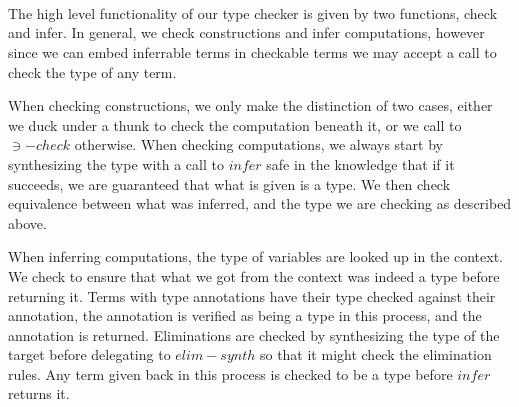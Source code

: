 {\begin{code}
\AgdaSymbol{\{}\AgdaSymbol{\}}\AgdaSpace{}%
\AgdaSymbol{(}\AgdaSpace{}%
\AgdaSpace{}%
\AgdaSymbol{)}\AgdaSpace{}%
\AgdaSymbol{(}\AgdaSpace{}%
\AgdaSpace{}%
\AgdaSymbol{)}\AgdaSpace{}%
\AgdaSymbol{=}%
\>[284I]\<%
\\
\>[284I][@{}l@{\AgdaIndent{0}}]%
\>[35]\AgdaSymbol{\AgdaUnderscore{}}\AgdaSpace{}%
\AgdaSpace{}%
\AgdaSpace{}%
\AgdaSpace{}%
\<%
\\
%
\>[35]\AgdaSpace{}%
\<%
\\
\>[0]\AgdaSpace{}%
\AgdaSpace{}%
%
\>[10]\AgdaSymbol{=}\AgdaSpace{}%
\AgdaSpace{}%
\AgdaSymbol{(}\AgdaSpace{}%
\AgdaOperator{\AgdaFunction{++}}\AgdaSpace{}%
\AgdaSpace{}%
\AgdaSpace{}%
\AgdaOperator{\AgdaFunction{++}}\AgdaSpace{}%
\AgdaSpace{}%
\AgdaOperator{\AgdaFunction{++}}\AgdaSpace{}%
\AgdaSpace{}%
\AgdaSymbol{)}\<%
\end{code}
}

The high level functionality of our type checker is given by two functions,
check and infer. In general, we check constructions and infer computations,
however since we can embed inferrable terms in checkable terms we may accept
a call to check the type of any term.

When checking constructions, we only make the distinction of two cases,
either we duck under a thunk to check the computation beneath it, or we
call to $∋-check$ otherwise. When checking computations, we always start
by synthesizing the type with a call to $infer$ safe in the knowledge that
if it succeeds, we are guaranteed that what is given is a type. We then check
equivalence between what was inferred, and the type we are checking as
described above.

When inferring computations, the type of variables are looked up in the
context. We check to ensure that what we got from the context was indeed
a type before returning it. Terms with type annotations have their
type checked against their annotation, the annotation is verified as being
a type in this process, and the annotation is returned. Eliminations are
checked by synthesizing the type of the target before delegating to $elim-synth$
so that it might check the elimination rules. Any term given back in this
process is checked to be a type before $infer$ returns it.


